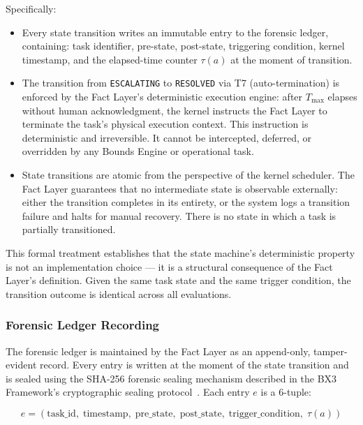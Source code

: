 Specifically:

\begin{itemize}
\item Every state transition writes an immutable entry to the forensic ledger, containing: task identifier, pre-state, post-state, triggering condition, kernel timestamp, and the elapsed-time counter $\tau(a)$ at the moment of transition.

\item The transition from \texttt{ESCALATING} to \texttt{RESOLVED} via T7 (auto-termination) is enforced by the Fact Layer's deterministic execution engine: after $T_{\text{max}}$ elapses without human acknowledgment, the kernel instructs the Fact Layer to terminate the task's physical execution context. This instruction is deterministic and irreversible. It cannot be intercepted, deferred, or overridden by any Bounds Engine or operational task.

\item State transitions are atomic from the perspective of the kernel scheduler. The Fact Layer guarantees that no intermediate state is observable externally: either the transition completes in its entirety, or the system logs a transition failure and halts for manual recovery. There is no state in which a task is partially transitioned.
\end{itemize}

This formal treatment establishes that the state machine's deterministic property is not an implementation choice — it is a structural consequence of the Fact Layer's definition. Given the same task state and the same trigger condition, the transition outcome is identical across all evaluations.

\subsubsection{Forensic Ledger Recording}
\label{sec:forensic-ledger}

The forensic ledger is maintained by the Fact Layer as an append-only, tamper-evident record. Every entry is written at the moment of the state transition and is sealed using the SHA-256 forensic sealing mechanism described in the BX3 Framework's cryptographic sealing protocol~\cite{bx3-wp-06}. Each entry $e$ is a 6-tuple:

\begin{equation}
e = (\text{task\_id}, \; \text{timestamp}, \; \text{pre\_state}, \; \text{post\_state}, \; \text{trigger\_condition}, \; \tau(a))
\tag{L-edger-entry}
\end{equation}

